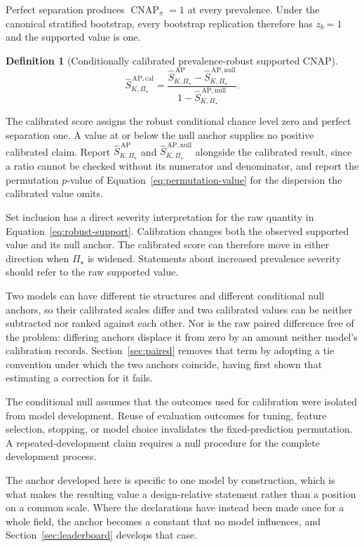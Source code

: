 \documentclass[11pt]{article}
\newcommand{\CNAP}{\operatorname{CNAP}}
\newcommand{\PSet}{\Pi_\star}
\newcommand{\SRobHat}{\widehat S_{K,\PSet}^{\,\mathrm{AP}}}
\newcommand{\SRobNullHat}{\widehat S_{K,\PSet}^{\,\mathrm{AP,null}}}
\newcommand{\SRobCalHat}{\widehat S_{K,\PSet}^{\,\mathrm{AP,cal}}}
\newtheorem{definition}{Definition}
\theoremstyle{remark}
\begin{document}
Perfect separation produces $\CNAP_\pi=1$ at every prevalence. Under the canonical stratified bootstrap, every bootstrap replication therefore has $z_b=1$ and the supported value is one.

\begin{definition}[Conditionally calibrated prevalence-robust supported CNAP]
\begin{equation}
\SRobCalHat
=
\frac{
\SRobHat-\SRobNullHat
}{
1-\SRobNullHat
}.
\label{eq:robust-calibration}
\end{equation}
\end{definition}

The calibrated score assigns the robust conditional chance level zero and perfect separation one. A value at or below the null anchor supplies no positive calibrated claim. Report $\SRobHat$ and $\SRobNullHat$ alongside the calibrated result, since a ratio cannot be checked without its numerator and denominator, and report the permutation $p$-value of Equation~\eqref{eq:permutation-value} for the dispersion the calibrated value omits.

Set inclusion has a direct severity interpretation for the raw quantity in Equation~\eqref{eq:robust-support}. Calibration changes both the observed supported value and its null anchor. The calibrated score can therefore move in either direction when $\PSet$ is widened. Statements about increased prevalence severity should refer to the raw supported value.

Two models can have different tie structures and different conditional null anchors, so their calibrated scales differ and two calibrated values can be neither subtracted nor ranked against each other. Nor is the raw paired difference free of the problem: differing anchors displace it from zero by an amount neither model's calibration records. Section~\ref{sec:paired} removes that term by adopting a tie convention under which the two anchors coincide, having first shown that estimating a correction for it fails.

The conditional null assumes that the outcomes used for calibration were isolated from model development. Reuse of evaluation outcomes for tuning, feature selection, stopping, or model choice invalidates the fixed-prediction permutation. A repeated-development claim requires a null procedure for the complete development process.

The anchor developed here is specific to one model by construction, which is what makes the resulting value a design-relative statement rather than a position on a common scale. Where the declarations have instead been made once for a whole field, the anchor becomes a constant that no model influences, and Section~\ref{sec:leaderboard} develops that case.
\end{document}
